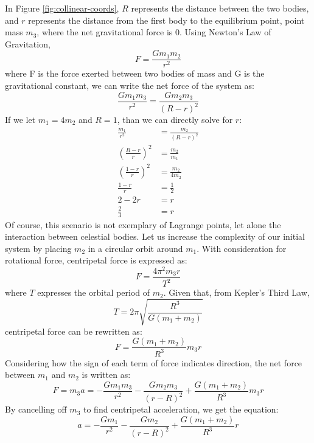 In Figure \ref{fig:collinear-coords}, $R$ represents the distance between the two bodies, and $r$ represents the distance from the first body to the equilibrium point, point mass $m_3$, where the net gravitational force is 0. Using Newton's Law of Gravitation,
\begin{equation*}
	F = \frac{Gm_1m_2}{r^2}
\end{equation*}
where F is the force exerted between two bodies of mass and G is the gravitational constant, we can write the net force of the system as:
\begin{equation*}
	\frac{Gm_1m_3}{r^2} = \frac{Gm_2m_3}{(R - r)^2}
\end{equation*}
If we let $m_1 = 4m_2$ and $R = 1$, than we can directly solve for $r$:
\begin{align*}
	\frac{m_1}{r^2} &= \frac{m_2}{(R - r)^2} \\
	\left(\frac{R - r}{r}\right)^2 &= \frac{m_2}{m_1} \\
	\left(\frac{1 - r}{r}\right)^2 &= \frac{m_2}{4m_2} \\
	\frac{1 - r}{r} &= \frac{1}{2} \\
	2 - 2r &= r \\
	\frac{2}{3} &= r
\end{align*}
Of course, this scenario is not exemplary of Lagrange points, let alone the interaction between celestial bodies. Let us increase the complexity of our initial system by placing $m_2$ in a circular orbit around $m_1$. With consideration for rotational force, centripetal force is expressed as:
\begin{equation*}
	F = \frac{4\pi^2m_3r}{T^2}
\end{equation*}
where $T$ expresses the orbital period of $m_2$. Given that, from Kepler's Third Law,
\begin{equation*}
	T = 2\pi \sqrt{\frac{R^3}{G(m_1 + m_2)}}
\end{equation*}
centripetal force can be rewritten as:
\begin{equation*}
	F = \frac{G(m_1+m_2)}{R^3}m_3r
\end{equation*}
Considering how the sign of each term of force indicates direction, the net force between $m_1$ and $m_2$ is written as:
\begin{equation*}
	F = m_3a = -\frac{Gm_1m_3}{r^2} - \frac{Gm_2m_3}{(r - R)^2} + \frac{G(m_1+m_2)}{R^3}m_3r
\end{equation*}
By cancelling off $m_3$ to find centripetal acceleration, we get the equation:
\begin{equation*}
	a = -\frac{Gm_1}{r^2} - \frac{Gm_2}{(r - R)^2} + \frac{G(m_1+m_2)}{R^3}r
\end{equation*}
